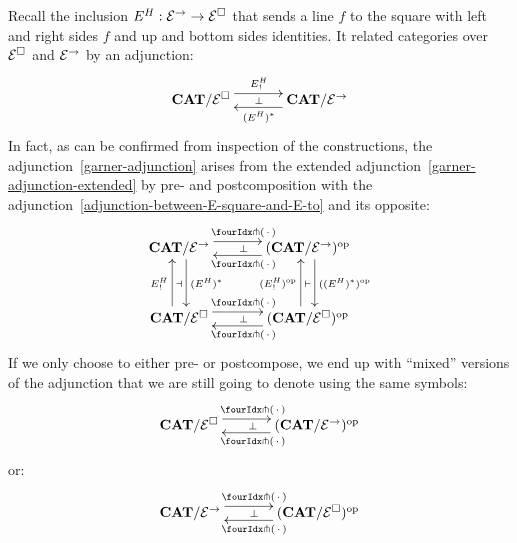 \documentclass[reqno,10pt,a4paper,oneside]{amsart}
\begin{document}
\begin{remark}
\label{extended-adjunction-gives-normal-one}
Recall the inclusion $E{}^{H} : \mathcal{E}^{\to} \to \mathcal{E}^{\Box}$ that sends a line $f$ to the square with left and right sides $f$ and up and bottom sides identities.
It related categories over $\mathcal{E}^{\Box}$ and $\mathcal{E}^{\to}$ by an adjunction:
\begin{equation}
\label{adjunction-between-E-square-and-E-to}
\begin{gathered}
\xymatrix@C+1em{
  \CAT/\catE^{\Box}
  \ar@<5pt>[r]^{E\sqhori_!}
  \ar@{}[r]|{\bot}
&
  \CAT/\catE^{\to}
  \ar@<5pt>[l]^{(E\sqhori)^*}
}
\end{gathered}
\end{equation}
In fact, as can be confirmed from inspection of the constructions, the adjunction~\eqref{garner-adjunction} arises from the extended adjunction~\eqref{garner-adjunction-extended} by pre- and postcomposition with the adjunction~\eqref{adjunction-between-E-square-and-E-to} and its opposite:
\begin{equation*}
\begin{gathered}
\xymatrix@R+1em@C+1em{
  \CAT/\catE^{\to}
  \ar@<5pt>[r]^{\liftl{\brarghole}}
  \ar@{}[r]|{\bot}
  \ar@<5pt>[d]^{(E\sqhori)^*}
  \ar@{}[d]|{\dashv}
&
  (\CAT/\catE^{\to})^{\op}
  \ar@<5pt>[l]^{\liftr{\brarghole}}
  \ar@<5pt>[d]^{((E\sqhori)^*)^{\op}}
  \ar@{}[d]|{\vdash}
\\
  \CAT/\catE^{\Box}
  \ar@<5pt>[r]^{\liftl{\brarghole}}
  \ar@{}[r]|{\bot}
  \ar@<5pt>[u]^{E\sqhori_!}
&
  (\CAT/\catE^{\Box})^{\op}
  \ar@<5pt>[l]^{\liftr{\brarghole}}
  \ar@<5pt>[u]^{(E\sqhori_!)^{\op}}
}
\end{gathered}
\end{equation*}
If we only choose to either pre- or postcompose, we end up with ``mixed'' versions of the adjunction that we are still going to denote using the same symbols:
\begin{equation}
\label{garner-adjunction-extended-mixed}
\begin{gathered}
\xymatrix@C+1em{
  \CAT/\catE^{\Box}
  \ar@<5pt>[r]^{\liftl{\brarghole}}
  \ar@{}[r]|{\bot}
&
  (\CAT/\catE^{\to})^{\op}
  \ar@<5pt>[l]^{\liftr{\brarghole}}
}
\end{gathered}
\end{equation}
or:
\begin{equation}
\label{garner-adjunction-extended-mixed'}
\begin{gathered}
\xymatrix@C+1em{
  \CAT/\catE^{\to}
  \ar@<5pt>[r]^{\liftl{\brarghole}}
  \ar@{}[r]|{\bot}
&
  (\CAT/\catE^{\Box})^{\op}
  \ar@<5pt>[l]^{\liftr{\brarghole}}
}
\end{gathered}
\end{equation}
\end{remark}
\end{document}
